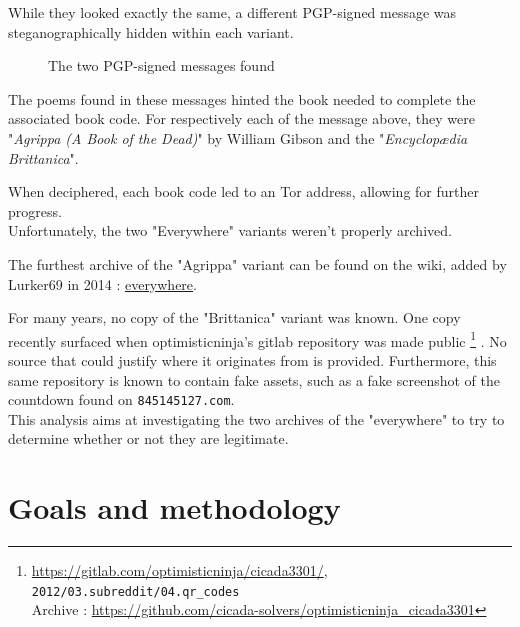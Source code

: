 \documentclass{article}
\begin{document}
While they looked exactly the same, a different PGP-signed message was steganographically hidden within each variant.

\begin{figure}[h]
	\centering
	\tiny

	\begin{minipage}{0.5\textwidth}
			
	\end{minipage}%
	\begin{minipage}{0.5\textwidth}
		
	\end{minipage}

	\caption{The two PGP-signed messages found}
\end{figure}
\FloatBarrier

The poems found in these messages hinted the book needed to complete the associated book code. For respectively each of the message above, they were "\textit{Agrippa (A Book of the Dead)}" by William Gibson and the "\textit{Encyclop\ae{}dia Brittanica}".

When deciphered, each book code led to an Tor address, allowing for further progress. \\

Unfortunately, the two "Everywhere" variants weren't properly archived.

The furthest archive of the "Agrippa" variant can be found on the wiki, added by Lurker69 in 2014 : \href{https://static.wikia.nocookie.net/uncovering-cicada/images/c/cd/Everyehere.jpg}{everywhere}.

For many years, no copy of the "Brittanica" variant was known. One copy recently surfaced when optimisticninja's gitlab repository was made public%
%
\footnote{\url{https://gitlab.com/optimisticninja/cicada3301/}, \texttt{2012/03.subreddit/04.qr\_codes}\\
	Archive :  \url{https://github.com/cicada-solvers/optimisticninja_cicada3301}}%
%
. No source that could justify where it originates from is provided. Furthermore, this same repository is known to contain fake assets, such as a fake screenshot of the countdown found on \texttt{845145127.com}. \\

This analysis aims at investigating the two archives of the "everywhere" to try to determine whether or not they are legitimate.

\section{Goals and methodology}
\end{document}
